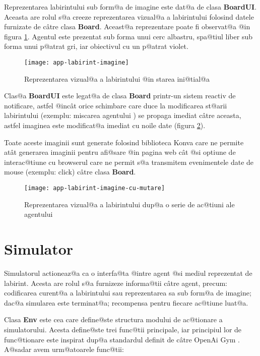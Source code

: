 Reprezentarea labirintului sub form@a de imagine este dat@a de clasa \textbf{BoardUI}. Aceasta are rolul s@a creeze reprezentarea vizual@a a labirintului folosind datele furnizate de c\^ atre clasa \textbf{Board}. Aceast@a reprezentare poate fi observat@a @in figura \ref{fig:labirint-imagine}. Agentul este prezentat sub forma unui cerc albastru, spa@tiul liber sub forma unui p@atrat gri, iar obiectivul cu un p@atrat violet.

\begin{figure}[h]
	\centering
	\texttt{[image: app-labirint-imagine]}
	\caption{Reprezentarea vizual@a a labirintului @in starea ini@tial@a}
	\label{fig:labirint-imagine}
\end{figure}

Clas@a \textbf{BoardUI} este legat@a de clasa \textbf{Board} printr-un sistem reactiv de notificare, astfel @inc\^ at orice schimbare care duce la modificarea st@arii labirintului (exemplu: miscarea agentului ) se propaga imediat c\^ atre aceasta, astfel imaginea este modificat@a imediat cu noile date (figura \ref{fig:labirint-imagine-cu-mutare}).

Toate aceste imaginii sunt generate folosind biblioteca Konva care ne permite at\^ at generarea imaginii pentru afi@sare @in pagina web c\^ at @si optiune de interac@tiune cu browserul care ne permit s@a transmitem evenimentele date de mouse (exemplu: click) c\^ atre clasa \textbf{Board}.

\begin{figure}[h]
	\centering
	\texttt{[image: app-labirint-imagine-cu-mutare]}
	\caption{Reprezentarea vizual@a a labirintului dup@a o serie de ac@tiuni ale agentului}
	\label{fig:labirint-imagine-cu-mutare}
\end{figure}


\section{Simulator}

Simulatorul actioneaz@a ca o interfa@ta @intre agent @si mediul reprezentat de labirint. Acesta are rolul s@a furnizeze informa@tii c\^ atre agent, precum: codificarea curent@a a labirintului sau reprezentarea sa sub form@a de imagine; dac@a simularea este terminat@a; recompensa pentru fiecare ac@tiune luat@a.

Clasa \textbf{Env} este cea care define@ste structura modului de ac@tionare a simulatorului. Acesta define@ste trei func@tii principale, iar principiul lor de func@tionare este inspirat dup@a standardul definit de c\^ atre OpenAi Gym \cite{open-ai-gym-env-format}. A@sadar avem urm@atoarele func@tii:

